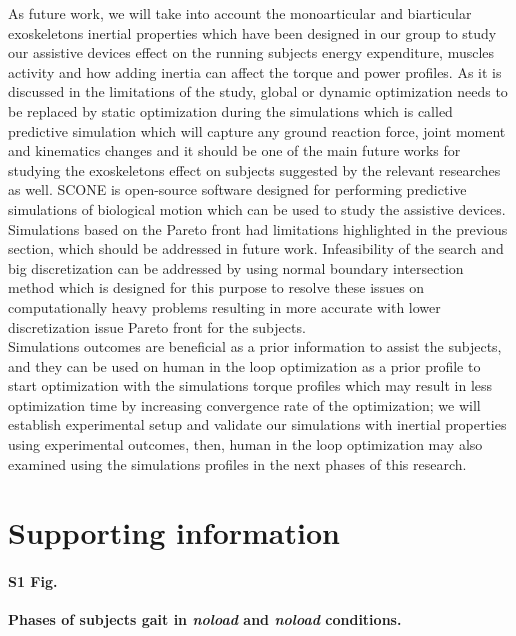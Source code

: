 \documentclass[10pt,letterpaper]{article}
\begin{document}
As future work, we will take into account the monoarticular and biarticular exoskeletons inertial properties which have been designed in our group to study our assistive devices effect on the running subjects energy expenditure, muscles activity and how adding inertia can affect the torque and power profiles. As it is discussed in the limitations of the study, global or dynamic optimization needs to be replaced by static optimization during the simulations which is called predictive simulation \cite{111,112} which will capture any ground reaction force, joint moment and kinematics changes and it should be one of the main future works for studying the exoskeletons effect on subjects suggested by the relevant researches \cite{2,93} as well. SCONE \cite{110} is open-source software designed for performing predictive simulations of biological motion which can be used to study the assistive devices.\\
Simulations based on the Pareto front had limitations highlighted in the previous section, which should be addressed in future work. Infeasibility of the search and big discretization can be addressed by using normal boundary intersection method \cite{108} which is designed for this purpose to resolve these issues on computationally heavy problems resulting in more accurate with lower discretization issue Pareto front for the subjects.\\
Simulations outcomes are beneficial as a prior information to assist the subjects, and they can be used on human in the loop optimization \cite{109} as a prior profile to start optimization with the simulations  torque profiles which may result in less optimization time by increasing convergence rate of the optimization; we will establish experimental setup and validate our simulations with inertial properties using experimental outcomes, then, human in the loop optimization may also examined using the simulations profiles in the next phases of this research.\\
\section*{\textbf{Supporting information}}

\paragraph*{S1 Fig.}
\label{S1_Fig}
{\bf Phases of subjects gait in \textit{noload} and \textit{noload} conditions.}
\end{document}

